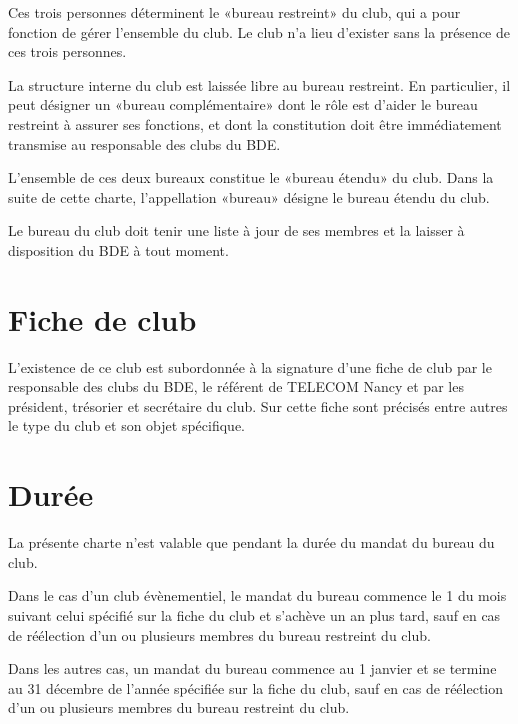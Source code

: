 \documentclass{article}
\begin{document}
\begin{multicols}{2}
{			Ces trois personnes déterminent le «bureau restreint» du club, qui a
			pour fonction de gérer l'ensemble du club. Le club n'a lieu
			d'exister sans la présence de ces trois personnes.

			La structure interne du club est laissée libre au bureau restreint.
			En particulier, il peut désigner un «bureau complémentaire» dont le
			rôle est d'aider le bureau restreint à assurer ses fonctions, et
			dont la constitution doit être immédiatement transmise au
			responsable des clubs du BDE\@.

			L'ensemble de ces deux bureaux constitue le «bureau étendu» du club.
			Dans la suite de cette charte, l'appellation «bureau» désigne le
			bureau étendu du club.

			Le bureau du club doit tenir une liste à jour de ses membres et la
			laisser à disposition du BDE à tout moment.

		}

		\section{Fiche de club}
\label{sec:fiche_de_club}

		{\small

			L'existence de ce club est subordonnée à la signature d'une fiche de
			club par le responsable des clubs du BDE, le référent de TELECOM
			Nancy et par les président, trésorier et secrétaire du club. Sur
			cette fiche sont précisés entre autres le type du club et son objet
			spécifique.

		}

		\section{Durée}
\label{sec:duree}

		{\small
			
			La présente charte n'est valable que pendant la durée du mandat du
			bureau du club.

			Dans le cas d'un club évènementiel, le mandat du bureau commence le
			1 du mois suivant celui spécifié sur la fiche du club et
			s'achève un an plus tard, sauf en cas de réélection d'un ou
			plusieurs membres du bureau restreint du club.

			Dans les autres cas, un mandat du bureau commence au 1
			janvier et se termine au 31 décembre de l'année spécifiée sur la
			fiche du club, sauf en cas de réélection d'un ou plusieurs membres
			du bureau restreint du club.

}
\end{multicols}
\end{document}
